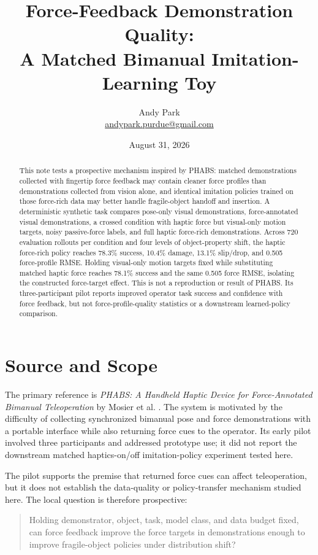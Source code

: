 \documentclass[11pt]{article}
\title{Force-Feedback Demonstration Quality:\\A Matched Bimanual Imitation-Learning Toy}
\author{Andy Park\\\href{mailto:andypark.purdue@gmail.com}{andypark.purdue@gmail.com}}
\date{August 31, 2026}
\begin{document}
\maketitle

\begin{abstract}
This note tests a prospective mechanism inspired by PHABS: matched demonstrations collected with fingertip force feedback may contain cleaner force profiles than demonstrations collected from vision alone, and identical imitation policies trained on those force-rich data may better handle fragile-object handoff and insertion. A deterministic synthetic task compares pose-only visual demonstrations, force-annotated visual demonstrations, a crossed condition with haptic force but visual-only motion targets, noisy passive-force labels, and full haptic force-rich demonstrations. Across 720 evaluation rollouts per condition and four levels of object-property shift, the haptic force-rich policy reaches 78.3\% success, 10.4\% damage, 13.1\% slip/drop, and 0.505 force-profile RMSE. Holding visual-only motion targets fixed while substituting matched haptic force reaches 78.1\% success and the same 0.505 force RMSE, isolating the constructed force-target effect. This is not a reproduction or result of PHABS. Its three-participant pilot reports improved operator task success and confidence with force feedback, but not force-profile-quality statistics or a downstream learned-policy comparison.
\end{abstract}

\section{Source and Scope}

The primary reference is \emph{PHABS: A Handheld Haptic Device for Force-Annotated Bimanual Teleoperation} by Mosier et al. \cite{phabs}. The system is motivated by the difficulty of collecting synchronized bimanual pose and force demonstrations with a portable interface while also returning force cues to the operator. Its early pilot involved three participants and addressed prototype use; it did not report the downstream matched haptics-on/off imitation-policy experiment tested here.

The pilot supports the premise that returned force cues can affect teleoperation, but it does not establish the data-quality or policy-transfer mechanism studied here. The local question is therefore prospective:
\begin{quote}
Holding demonstrator, object, task, model class, and data budget fixed, can force feedback improve the force targets in demonstrations enough to improve fragile-object policies under distribution shift?
\end{quote}
\end{document}
